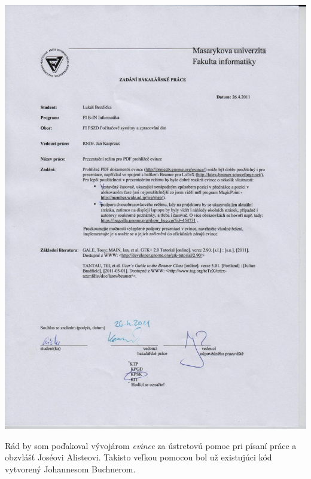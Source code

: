 \documentclass[12pt,oneside,final]{fithesis2}
\begin{document}
\FrontMatter
\ThesisTitlePage

\includegraphics[height=\textheight]{zadani.pdf}


\begin{ThesisDeclaration}
\DeclarationText
\AdvisorName
\end{ThesisDeclaration}

\begin{ThesisThanks}
Rád by som poďakoval vývojárom \emph{evince} za ústretovú pomoc pri písaní práce a obzvlášť Joséovi Alisteovi. Takisto veľkou pomocou bol už existujúci kód vytvorený Johannesom Buchnerom.
\end{ThesisThanks}  
\end{document}
